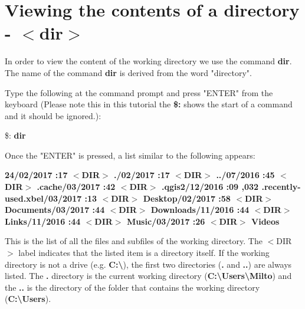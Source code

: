\documentclass{article}
\begin{document}
	\newpage \newpage
	\section{Viewing the contents of a directory  - $<$dir$>$}
	\par In order to view the content of the working directory we use the command \textbf{dir}. The name of the command \textbf{dir} is derived from the word "directory".  
	
	\par Type the following at the command prompt and press "ENTER" from the keyboard (Please note this in this tutorial the \textbf{\$:} shows the start of a command and it should be ignored.):
	
	\par \$: \textbf{dir}
	 
	\par Once the "ENTER" is pressed, a list similar to the following appears:
	

		\setlength{\parindent}{-0.125cm}
\par \textbf{
	24/02/2017 :17 \quad  $<$DIR$>$  \quad  \qquad \quad ./02/2017 :17 \quad  $<$DIR$>$  \quad  \qquad \quad ../07/2016 :45 \quad  $<$DIR$>$  \quad  \qquad \quad .cache/03/2017 :42 \quad  $<$DIR$>$  \quad  \qquad \quad .qgis2/12/2016 :09 \quad  \qquad  {},032 \quad .recently-used.xbel/03/2017 :13 \quad  $<$DIR$>$  \quad  \qquad \quad Desktop/02/2017 :58 \quad  $<$DIR$>$  \quad  \qquad \quad Documents/03/2017 :44  \quad  $<$DIR$>$  \quad  \qquad \quad Downloads/11/2016 :44 \quad  $<$DIR$>$  \quad  \qquad \quad Links/11/2016 :44 \quad  $<$DIR$>$  \quad  \qquad \quad Music/03/2017 :26 \quad  $<$DIR$>$  \quad  \qquad \quad Videos\newline
	}

	\setlength{\parindent}{0cm}
	
	\par This is the list of all the files and subfiles of the working directory. The  $<$DIR$>$ label indicates that the listed item is a directory itself. If the working directory is not a drive (e.g. \textbf{C:\textbackslash}), the first two directories (\textbf{.} and \textbf{..}) are always listed. The \textbf{.} directory is the current working directory (\textbf{C:\textbackslash Users\textbackslash Milto}) and the \textbf{..}  is the directory of the folder that contains the working directory (\textbf{C:\textbackslash Users}).
	
\end{document}
